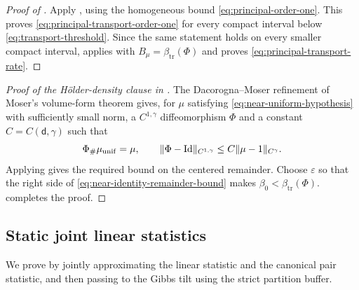 \documentclass[11pt,reqno]{amsart}
\numberwithin{equation}{section}
\theoremstyle{plain}
\theoremstyle{definition}
\DeclarePairedDelimiter{\norm}{\lVert}{\rVert}
\renewcommand{\d}{\mathsf d}
\newcommand{\Id}{\operatorname{Id}}
\newcommand{\be}{\beta}
\newcommand{\vep}{\varepsilon}
\newcommand{\muunif}{\mu_{\mathrm{unif}}}
\newcommand{\tr}{\mathrm{tr}}
\begin{document}
\begin{proof}[Proof of ]
Apply , using the homogeneous bound \eqref{eq:principal-order-one}.  This proves \eqref{eq:principal-transport-order-one} for every compact interval below \eqref{eq:transport-threshold}.  Since the same statement holds on every smaller compact interval,  applies with $B_{\mu}=\beta_{\tr}(\Phi)$ and proves \eqref{eq:principal-transport-rate}.
\end{proof}

\begin{proof}[Proof of the H\"older-density clause in ]
The Dacorogna--Moser refinement of Moser's volume-form theorem \cite{Moser1965,DacorognaMoser1990} gives, for $\mu$ satisfying \eqref{eq:near-uniform-hypothesis} with sufficiently small norm, a $C^{1,\gamma}$ diffeomorphism $\Phi$ and a constant $C=C(\d,\gamma)$ such that
\begin{equation}
 \Phi_{\#}\muunif=\mu,
 \qquad
 \norm{\Phi-\Id}_{C^{1,\gamma}}
 \leq C\norm{\mu-1}_{C^\gamma}.
 \label{eq:dacorogna-moser-stability}
\end{equation}
Applying  gives the required bound on the centered remainder. Choose $\vep$ so that the right side of \eqref{eq:near-identity-remainder-bound} makes $\be_0<\beta_{\tr}(\Phi)$.   completes the proof.
\end{proof}

\subsection{Static joint linear statistics}
\label{subsec:static-linear-statistics}

We prove  by jointly approximating the linear statistic and the canonical pair statistic, and then passing to the Gibbs tilt using the strict partition buffer.
\end{document}
